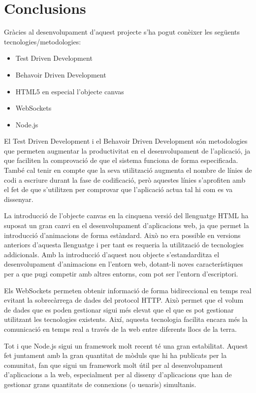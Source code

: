 \chapter{Conclusions}
\label{chap:conclusions}

Gràcies al desenvolupament d'aquest projecte s'ha pogut conèixer les següents tecnologies/metodologies: 

\begin{itemize}
\item{Test Driven Development}
\item{Behavoir Driven Development}
\item{HTML5 en especial l'objecte canvas}
\item{WebSockets}
\item{Node.js}
\end{itemize}

El Test Driven Development i el Behavoir Driven Development són metodologies que permeten augmentar la productivitat en el desenvolupament de l'aplicació, ja que faciliten la comprovació de que el sistema funciona de forma especificada. També cal tenir en compte que la seva utilització augmenta el nombre de línies de codi a escriure durant la fase de codificació, però aquestes línies s'aprofiten amb el fet de que s'utilitzen per comprovar que l'aplicació actua tal hi com es va dissenyar. 

La introducció de l'objecte canvas en la cinquena versió del llenguatge HTML ha suposat un gran canvi en el desenvolupament d'aplicacions web, ja que permet la introducció d'animacions de forma estàndard. Això no era possible en versions anteriors d'aquesta llenguatge i per tant es requeria la utilització de tecnologies addicionals. Amb la introducció d'aquest nou objecte s'estandarditza el desenvolupament d'animacions en l'entorn web, dotant-li noves característiques per a que pugi competir amb altres entorns, com pot ser l'entorn d'escriptori. 

Els WebSockets permeten obtenir informació de forma bidireccional en temps real evitant la sobrecàrrega de dades del protocol HTTP. Això permet que el volum de dades que es poden gestionar sigui més elevat que el que es pot gestionar utilitzant les tecnologies existents. Així, aquesta tecnologia facilita encara més la comunicació en temps real a través de la web entre diferents llocs de la terra. 

Tot i que Node.js sigui un framework molt recent té una gran estabilitat. Aquest fet juntament amb la gran quantitat de mòduls que hi ha publicats per la comunitat, fan que sigui un framework molt útil per al desenvolupament d'aplicacions a la web, especialment per al disseny d'aplicacions que han de gestionar grans quantitats de connexions (o usuaris) simultanis. 

